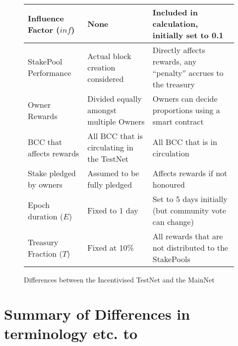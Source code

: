 \documentclass[11pt,a4paper,dvipsnames,twosided,final]{article}
\begin{document}
\begin{figure}[h!]
\begin{center}
\begin{tabular}{||l|p{4cm}|p{4cm}||}
Influence Factor ($\textit{inf}$)
& None
& Included in calculation, initially set to 0.1
                                              \\\hline
StakePool Performance
& Actual block creation considered
& Directly affects rewards, any ``penalty'' accrues to the treasury
                                              \\\hline
Owner Rewards
& Divided equally amongst multiple Owners
& Owners can decide proportions using a smart contract
                                              \\\hline
BCC that affects rewards
& All BCC that is circulating in the TestNet
& All BCC that is in circulation
                                              \\\hline
Stake pledged by owners
& Assumed to be fully pledged
& %
Affects rewards if not honoured
                                              \\\hline
Epoch duration ($E$)
& Fixed to 1 day
& Set to 5 days initially (but community vote can change)
                                              \\\hline
Treasury Fraction ($T$)
& Fixed at 10\%
& All rewards that are not distributed to the StakePools
                                              \\\hline
\hline
\end{tabular}
\end{center}
\caption{Differences between the Incentivised TestNet and the MainNet}
\end{figure}

\clearpage



\clearpage
\appendix

\section{Summary of Differences in terminology etc. to \cite{delegation_design}}
\label{app:diffs}
\end{document}
